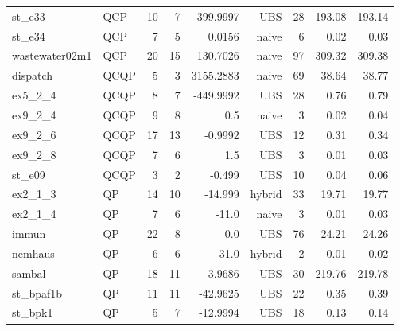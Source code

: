 \documentclass[a4paper,landscape]{article}
\begin{document}
\begin{center}
\begin{tabular}{|l|l|r|r|r|r|r|r|r|}
st\_e33 & QCP & 10 & 7 & -399.9997 & UBS & 28 & 193.08 & 193.14 \\
st\_e34 & QCP & 7 & 5 & 0.0156 & naive & 6 & 0.02 & 0.03 \\
wastewater02m1 & QCP & 20 & 15 & 130.7026 & naive & 97 & 309.32 & 309.38 \\
dispatch & QCQP & 5 & 3 & 3155.2883 & naive & 69 & 38.64 & 38.77 \\
ex5\_2\_4 & QCQP & 8 & 7 & -449.9992 & UBS & 28 & 0.76 & 0.79 \\
ex9\_2\_4 & QCQP & 9 & 8 & 0.5 & naive & 3 & 0.02 & 0.04 \\
ex9\_2\_6 & QCQP & 17 & 13 & -0.9992 & UBS & 12 & 0.31 & 0.34 \\
ex9\_2\_8 & QCQP & 7 & 6 & 1.5 & UBS & 3 & 0.01 & 0.03 \\
st\_e09 & QCQP & 3 & 2 & -0.499 & UBS & 10 & 0.04 & 0.06 \\
ex2\_1\_3 & QP & 14 & 10 & -14.999 & hybrid & 33 & 19.71 & 19.77 \\
ex2\_1\_4 & QP & 7 & 6 & -11.0 & naive & 3 & 0.01 & 0.03 \\
immun & QP & 22 & 8 & 0.0 & UBS & 76 & 24.21 & 24.26 \\
nemhaus & QP & 6 & 6 & 31.0 & hybrid & 2 & 0.01 & 0.02 \\
sambal & QP & 18 & 11 & 3.9686 & UBS & 30 & 219.76 & 219.78 \\
st\_bpaf1b & QP & 11 & 11 & -42.9625 & UBS & 22 & 0.35 & 0.39 \\
st\_bpk1 & QP & 5 & 7 & -12.9994 & UBS & 18 & 0.13 & 0.14 \\
\hline  \end{tabular}
\end{center}
\newpage
\end{document}

